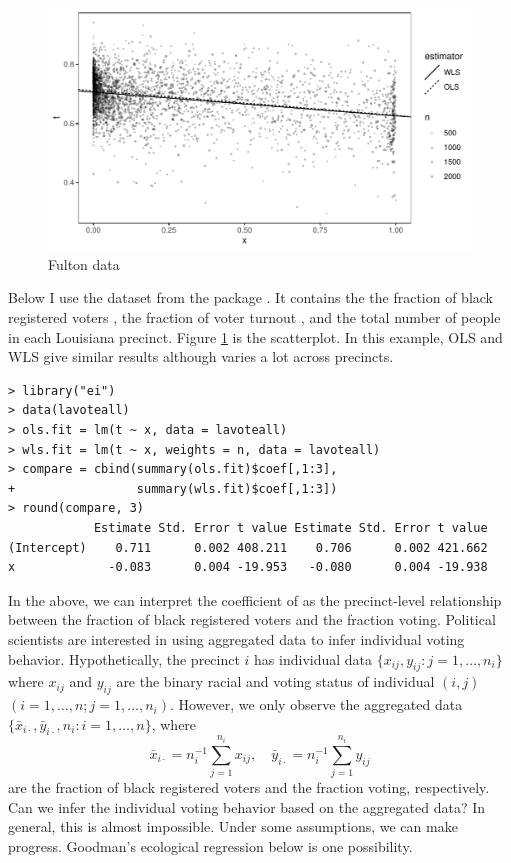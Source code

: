 \begin{figure}
\centering
\includegraphics[width = \textwidth]{figures/lavoteall_plot.pdf}
\caption{Fulton data}\label{fig::lavoteall}
\end{figure}




Below I use the   dataset from the  package . It contains the 
the fraction of black registered voters , the fraction of voter turnout , and the total number of people  in each Louisiana precinct. 
Figure \ref{fig::lavoteall} is the scatterplot. In this example, OLS and WLS give similar results although  varies a lot across precincts. 


\begin{lstlisting}
> library("ei")
> data(lavoteall)
> ols.fit = lm(t ~ x, data = lavoteall)
> wls.fit = lm(t ~ x, weights = n, data = lavoteall)
> compare = cbind(summary(ols.fit)$coef[,1:3], 
+                 summary(wls.fit)$coef[,1:3])
> round(compare, 3)
            Estimate Std. Error t value Estimate Std. Error t value
(Intercept)    0.711      0.002 408.211    0.706      0.002 421.662
x             -0.083      0.004 -19.953   -0.080      0.004 -19.938
\end{lstlisting}




 
In the above, we can interpret the coefficient of  as the precinct-level relationship between the fraction of black registered voters and the fraction voting. Political scientists are interested in using aggregated data to infer individual voting behavior.
Hypothetically, the precinct $i$ has individual data $\{  x_{ij}, y_{ij}  : j = 1, \ldots, n_i\}$ where $x_{ij}$ and $y_{ij}$ are the binary racial and voting status of individual $(i, j)$ $(i=1,\ldots, n; j = 1, \ldots, n_i)$. However, we only observe the aggregated data $\{ \bar{x}_{i\cdot}, \bar{y}_{i\cdot}, n_i :  i = 1,\ldots, n\}$, where 
$$
\bar{x}_{i\cdot} = n_i^{-1} \sum_{j=1}^{n_i}  x_{ij},\quad
\bar{y}_{i\cdot} = n_i^{-1} \sum_{j=1}^{n_i}  y_{ij}
$$ 
are the fraction of black registered voters and the fraction voting, respectively. Can we infer the individual voting behavior based on the aggregated data? In general, this is almost impossible. Under some assumptions, we can make progress. Goodman's ecological regression below is one possibility.  


